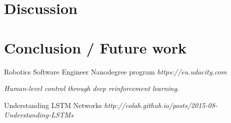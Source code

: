 \documentclass[10pt,journal,compsoc]{IEEEtran}
\begin{document}
\section{Discussion}

\section{Conclusion / Future work}



\begin{thebibliography}{9}


Robotics Software Engineer Nanodegree program
\textit{https://eu.udacity.com}

\textit{Human-level control through deep reinforcement learning}. 

Understanding LSTM Networks
\textit{http://colah.github.io/posts/2015-08-Understanding-LSTMs}

\end{thebibliography}
\end{document}
